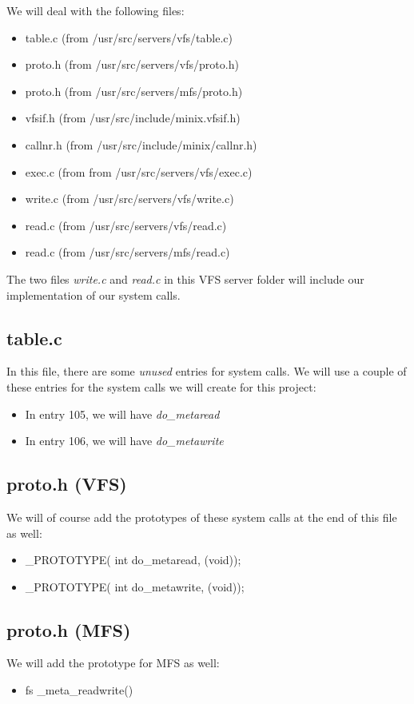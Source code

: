 \documentclass[paper=a4, fontsize=11pt]{scrartcl}
\numberwithin{equation}{section} %
\numberwithin{figure}{section} %
\numberwithin{table}{section} %
\begin{document}
We will deal with the following files:
	\begin{itemize}
		\item table.c (from /usr/src/servers/vfs/table.c)
		\item proto.h (from /usr/src/servers/vfs/proto.h)
		\item proto.h (from /usr/src/servers/mfs/proto.h)
		\item vfsif.h (from /usr/src/include/minix.vfsif.h)
		\item callnr.h (from /usr/src/include/minix/callnr.h)
		\item exec.c (from from /usr/src/servers/vfs/exec.c)
		\item write.c (from /usr/src/servers/vfs/write.c)
		\item read.c (from /usr/src/servers/vfs/read.c)
		\item read.c (from /usr/src/servers/mfs/read.c)
		\end {itemize}
The two files {\it write.c} and {\it read.c} in this VFS server folder will include our implementation of our system calls.


	\subsection{table.c}
	In this file, there are some {\it unused} entries for system calls. We will use a couple of these entries for the system calls we will create for this project:
		\begin{itemize}
			\item In entry 105, we will have {\it do\_metaread}
			\item In entry 106, we will have {\it do\_metawrite}
		\end{itemize}


	\subsection{proto.h (VFS)}
	We will of course add the prototypes of these system calls at the end of this file as well:
		\begin{itemize}
			\item \_PROTOTYPE( int do\_metaread, (void));
			\item \_PROTOTYPE( int do\_metawrite, (void));
		\end{itemize}


	\subsection{proto.h (MFS)}
	We will add the prototype for MFS as well:
		\begin{itemize}
			\item fs \_meta\_readwrite()
		\end{itemize}			
	
\end{document}
